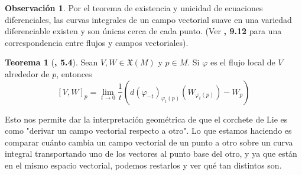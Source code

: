 \documentclass[spanish]{book}
\theoremstyle{definition}
\newtheorem*{teo}{Teorema}
\newtheorem*{obs}{Observación}
\newcommand{\X}{\mathfrak{X}}
\begin{document}
\begin{obs}
	Por el teorema de existencia y unicidad de ecuaciones diferenciales, las curvas integrales de un campo vectorial suave en una variedad diferenciable existen y son únicas cerca de cada punto. (Ver \cite{Lee}\textbf{, 9.12} para una correspondencia entre flujos y campos vectoriales).
\end{obs}
\begin{teo}[\cite{DoCarmo}\textbf{, 5.4}]
	Sean $V,W\in\X(M)$ y $p\in M$. Si $\varphi$ es el flujo local de $V$ alrededor de $p$, entonces
	\[[V,W]_p=\lim_{t\to 0}\frac{1}{t}\left(d(\varphi_{-t})_{\varphi_t(p)}(W_{\varphi_t(p)})-W_p\right)\]
\end{teo}
Esto nos permite dar la interpretación geométrica de que el corchete de Lie es como "derivar un campo vectorial respecto a otro". Lo que estamos haciendo es comparar cuánto cambia un campo vectorial de un punto a otro sobre un curva integral transportando uno de los vectores al punto base del otro, y ya que están en el mismo espacio vectorial, podemos restarlos y ver qué tan distintos son.
\end{document}

